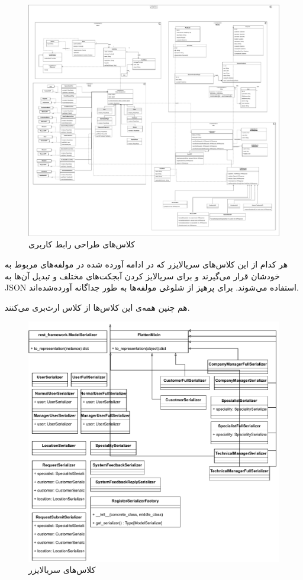 \eject \pdfpagewidth=25in \pdfpageheight=25in

\begin{figure}[ht!]
	\centering
	\includegraphics[scale=0.8]{figs/design-class/front.pdf}
	\caption{کلاس‌های طراحی رابط کاربری}
\end{figure}
\FloatBarrier
\newpage

\recalctypearea

هر کدام از این کلاس‌های سریالایزر که در ادامه آورده شده در مولفه‌های مربوط به خودشان قرار می‌گیرند و برای سریالایز کردن آبجکت‌های مختلف و تبدیل آن‌ها به JSON استفاده می‌شوند. برای پرهیز از شلوغی مولفه‌ها به طور جداگانه آورده‌شده‌اند.

هم چنین همه‌ی این کلاس‌ها از کلاس
ارث‌بری می‌کنند.

\begin{figure}[ht!]
	\centering
	\includegraphics[scale=0.8]{figs/design-class/serial.pdf}
	\caption{کلاس‌های سریالایزر}
\end{figure}
\FloatBarrier
\newpage


\recalctypearea
\newpage

